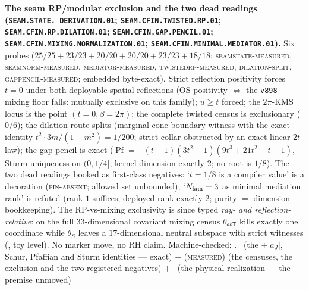 \documentclass[11pt,a4paper]{article}
\theoremstyle{definition}
\begin{document}
\par\smallskip\noindent\textbf{The seam RP/modular exclusion and
the two dead readings (\texttt{SEAM.STATE.\allowbreak
DERIVATION.01}; \texttt{SEAM.CFIN.TWISTED.\allowbreak RP.01};
\texttt{SEAM.CFIN.RP.\allowbreak DILATION.01};
\texttt{SEAM.CFIN.GAP.\allowbreak PENCIL.01};
\texttt{SEAM.CFIN.MIXING.\allowbreak NORMALIZATION.01};
\texttt{SEAM.CFIN.MINIMAL.\allowbreak MEDIATOR.01}).}
Six probes ($25/25 + 23/23 + 20/20 + 20/20 + 23/23 + 18/18$;
\textsc{seamstate-measured}, \textsc{seamnorm-measured},
\textsc{mediator-measured}, \textsc{twistedrp-measured},
\textsc{dilation-split}, \textsc{gappencil-measured}; embedded
byte-exact).  Strict reflection positivity forces $t = 0$ under
both deployable spatial reflections (OS positivity $\iff$ the
\texttt{v898} mixing floor falls: mutually exclusive on this
family); $u \ge t$ forced; the $2\pi$-KMS locus is the point
$(t{=}0, \beta{=}2\pi)$; the complete twisted census is
exclusionary ($0/6$); the dilation route splits (marginal
cone-boundary witness with the exact identity $t^2 \cdot
3m/(1-m^2) = 1/200$; strict collar obstructed by an exact linear
$2t$ law); the gap pencil is exact
($\operatorname{Pf} = -(t-1)(3t^2-1)(9t^3+21t^2-t-1)$, Sturm
uniqueness on $(0, 1/4]$, kernel dimension exactly $2$; no root
is $1/8$).  The two dead readings booked as first-class
negatives: `$t = 1/8$ is a compiler value' is a decoration
(\textsc{pin-absent}; allowed set unbounded); `$N_{\rm fam} = 3$
as minimal mediation rank' is refuted (rank $1$ suffices;
deployed rank exactly $2$; purity $=$ dimension bookkeeping).
The RP-vs-mixing exclusivity is since typed \emph{ray- and
reflection-relative}: on the full $33$-dimensional covariant
mixing census $\theta_{ab\mathsf T}$ kills exactly one
coordinate while $\theta_S$ leaves a $17$-dimensional neutral
subspace with strict witnesses
(, toy level).
No marker move, no RH claim.
Machine-checked: .
\mE\ (the $\pm|a_J|$, Schur, Pfaffian and Sturm identities ---
exact) $+$ (\textsc{measured}) (the censuses, the exclusion and
the two registered negatives) $+$ \mO\ (the physical realization
--- the premise unmoved)
\par\smallskip
\end{document}

